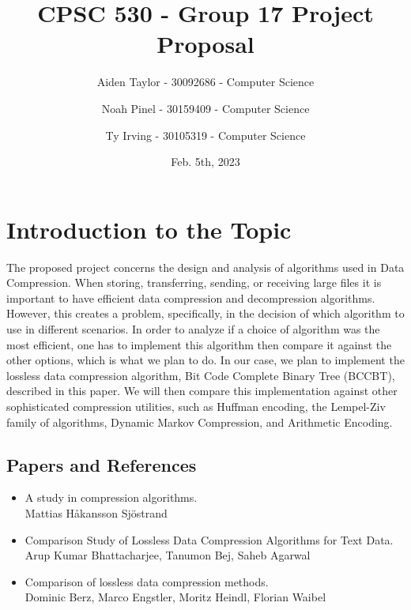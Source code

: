 \documentclass[11pt]{article}
\title{CPSC 530 - Group 17 Project Proposal}
\author{
Aiden Taylor - 30092686 - Computer Science
\and
Noah Pinel - 30159409 - Computer Science
\and
Ty Irving - 30105319 - Computer Science
}
\date{Feb. 5th, 2023}
\begin{document}
\maketitle
\newpage

\section*{Introduction to the Topic}
The proposed project concerns the design and analysis of algorithms used in Data Compression.
When storing, transferring, sending, or receiving large files it is important to have efficient data compression and decompression algorithms.
However, this creates a problem, specifically, in the decision of which algorithm to use in different scenarios.
In order to analyze if a choice of algorithm was the most efficient, one has to implement this algorithm then compare it against the other options,
which is what we plan to do.
In our case, we plan to implement
the lossless data compression algorithm, Bit Code Complete Binary Tree (BCCBT), described in this paper. 
We will then compare this implementation against other sophisticated compression utilities,
such as Huffman encoding, the Lempel-Ziv family of algorithms, Dynamic Markov Compression, and Arithmetic Encoding.

\subsection*{Papers and References}
\begin{itemize}
  \item A study in compression algorithms. \\
        Mattias Håkansson Sjöstrand 
  
\item Comparison Study of Lossless Data Compression Algorithms for Text Data. \\
   Arup Kumar Bhattacharjee, Tanumon Bej, Saheb Agarwal 
  
  \item Comparison of lossless data compression methods. \\
       Dominic Berz, Marco Engstler, Moritz Heindl, Florian Waibel  
\end{itemize}

\newpage
\end{document}
